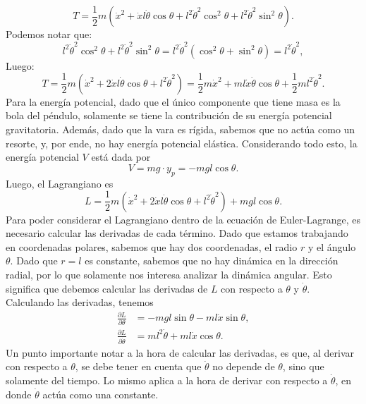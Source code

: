 \documentclass[
  11pt,
  letterpaper,
   addpoints,
   answers
  ]{exam}
\begin{document}
\begin{questions}
\begin{solution}
\begin{equation}
    T = \frac{1}{2} m \left( \dot{x}^2 + \dot{x} l \dot{\theta} \cos \theta + l^2 \dot{\theta}^2 \cos^2 \theta + l^2 \dot{\theta}^2 \sin^2 \theta \right). \tag{11}
\end{equation}
Podemos notar que:
\begin{equation}
    l^2 \dot{\theta}^2 \cos^2 \theta + l^2 \dot{\theta}^2 \sin^2 \theta = l^2 \dot{\theta}^2 (\cos^2 \theta + \sin^2 \theta) = l^2 \dot{\theta}^2, \tag{12}
\end{equation}
Luego:
\begin{equation}
    T = \frac{1}{2} m \left( \dot{x}^2 + 2 \dot{x} l \dot{\theta} \cos \theta + l^2 \dot{\theta}^2 \right) = \frac{1}{2} m \dot{x}^2 + m l \dot{x} \dot{\theta} \cos \theta + \frac{1}{2} m l^2 \dot{\theta}^2. \tag{13}
\end{equation}
Para la energía potencial, dado que el único componente que tiene masa es la bola del péndulo, solamente se tiene la contribución de su energía potencial gravitatoria. Además, dado que la vara es rígida, sabemos que no actúa como un resorte, y, por ende, no hay energía potencial elástica. Considerando todo esto, la energía potencial $V$ está dada por
\begin{equation}
    V = mg \cdot y_p = -mgl \cos \theta. \tag{14}
\end{equation}
Luego, el Lagrangiano es
\begin{equation}
    L = \frac{1}{2} m \left( \dot{x}^2 + 2 \dot{x} l \dot{\theta} \cos \theta + l^2 \dot{\theta}^2 \right) + mgl \cos \theta. \tag{15}
\end{equation}
Para poder considerar el Lagrangiano dentro de la ecuación de Euler-Lagrange, es necesario calcular las derivadas de cada término. Dado que estamos trabajando en coordenadas polares, sabemos que hay dos coordenadas, el radio \(r\) y el ángulo \(\theta\). Dado que \(r = l\) es constante, sabemos que no hay dinámica en la dirección radial, por lo que solamente nos interesa analizar la dinámica angular. Esto significa que debemos calcular las derivadas de \(L\) con respecto a \(\theta\) y \(\dot{\theta}\). Calculando las derivadas, tenemos
\begin{align}
    \frac{\partial L}{\partial \theta} &= -mgl \sin \theta - ml \dot{x} \sin \theta, \tag{20} \\
    \frac{\partial L}{\partial \dot{\theta}} &= ml^2 \dot{\theta} + ml \dot{x} \cos \theta. \tag{21}
\end{align}
Un punto importante notar a la hora de calcular las derivadas, es que, al derivar con respecto a \(\theta\), se debe tener en cuenta que \(\dot{\theta}\) no depende de \(\theta\), sino que solamente del tiempo. Lo mismo aplica a la hora de derivar con respecto a \(\dot{\theta}\), en donde \(\dot{\theta}\) actúa como una constante.

\end{solution}
\end{questions}
\end{document}
